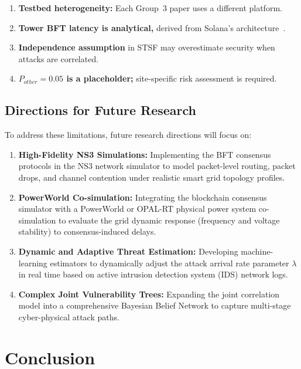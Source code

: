 \documentclass[10pt,twocolumn,letterpaper]{article}
\begin{document}
\begin{enumerate}[leftmargin=*]
    \item \textbf{Testbed heterogeneity:} Each Group~3 paper uses a different platform.
    \item \textbf{Tower BFT latency is analytical,} derived from Solana's architecture~\cite{yakovenko2018}.
    \item \textbf{Independence assumption} in STSF may overestimate security when attacks are correlated.
    \item \textbf{$P_{other} = 0.05$ is a placeholder;} site-specific risk assessment is required.
\end{enumerate}



\subsection{Directions for Future Research}
To address these limitations, future research directions will focus on:
\begin{enumerate}[leftmargin=*]
    \item \textbf{High-Fidelity NS3 Simulations:} Implementing the BFT consensus protocols in the NS3 network simulator to model packet-level routing, packet drops, and channel contention under realistic smart grid topology profiles.
    \item \textbf{PowerWorld Co-simulation:} Integrating the blockchain consensus simulator with a PowerWorld or OPAL-RT physical power system co-simulation to evaluate the grid dynamic response (frequency and voltage stability) to consensus-induced delays.
    \item \textbf{Dynamic and Adaptive Threat Estimation:} Developing machine-learning estimators to dynamically adjust the attack arrival rate parameter $\lambda$ in real time based on active intrusion detection system (IDS) network logs.
    \item \textbf{Complex Joint Vulnerability Trees:} Expanding the joint correlation model into a comprehensive Bayesian Belief Network to capture multi-stage cyber-physical attack paths.
\end{enumerate}
\section{Conclusion}
\label{sec:conclusion}
\end{document}
